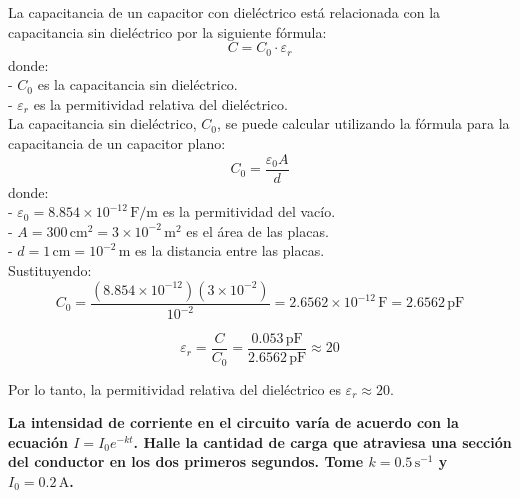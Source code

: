 \documentclass[answers]{exam} %
\begin{document}
\begin{questions}
	La capacitancia de un capacitor con dieléctrico está relacionada con la capacitancia sin dieléctrico por la siguiente fórmula:
	\[
		\boxed{C = C_0 \cdot \varepsilon_r}
	\]
	donde:\\
	- \(C_0\) es la capacitancia sin dieléctrico.\\
	- \(\varepsilon_r\) es la permitividad relativa del dieléctrico.\\

	La capacitancia sin dieléctrico, \(C_0\), se puede calcular utilizando la fórmula para la capacitancia de un capacitor plano:
	\[
		\boxed{C_0 = \frac{\varepsilon_0 A}{d}}
	\]
	donde:\\
	- \(\varepsilon_0 = 8.854 \times 10^{-12} \, \text{F/m}\) es la permitividad del vacío.\\
	- \(A = 300 \, \text{cm}^2 = 3 \times 10^{-2} \, \text{m}^2\) es el área de las placas.\\
	- \(d = 1 \, \text{cm} = 10^{-2} \, \text{m}\) es la distancia entre las placas.\\

	Sustituyendo:
	\[
		C_0 = \frac{(8.854 \times 10^{-12}) (3 \times 10^{-2})}{10^{-2}} = 2.6562 \times 10^{-12} \, \text{F} = 2.6562 \, \text{pF}
	\]

	\[
		\varepsilon_r = \frac{C}{C_0} = \frac{0.053 \, \text{pF}}{2.6562 \, \text{pF}} \approx 20
	\]

	Por lo tanto, la permitividad relativa del dieléctrico es \(\varepsilon_r \approx 20\).

	\begin{figure}[h]
		\centering

	\end{figure}
	\newpage
	\question \textbf{La intensidad de corriente en el circuito varía de acuerdo con la ecuación \(I = I_0 e^{-kt}\). Halle la cantidad de carga que atraviesa una sección del conductor en los dos primeros segundos. Tome \(k = 0.5 \, \text{s}^{-1}\) y \(I_0 = 0.2 \, \text{A}\).}




\end{questions}
\end{document}
